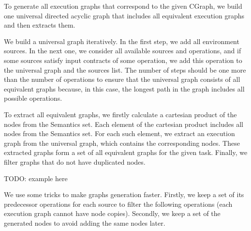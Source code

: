 To generate all execution graphs that correspond to the given CGraph, we build one universal directed acyclic graph that includes all equivalent execution graphs and then extracts them.





We build a universal graph iteratively.
In the first step, we add all environment sources.
In the next one, we consider all available sources and operations, and if some sources satisfy input contracts of some operation, we add this operation to the universal graph and the sources list.
The number of steps should be one more than the number of operations to ensure that the universal graph consists of all equivalent graphs because, in this case, the longest path in the graph includes all possible operations.

To extract all equivalent graphs, we firstly calculate a cartesian product of the nodes from the Semantics set.
Each element of the cartesian product includes all nodes from the Semantics set.
For each such element, we extract an execution graph from the universal graph, which contains the corresponding nodes.
These extracted graphs form a set of all equivalent graphs for the given task.
Finally, we filter graphs that do not have duplicated nodes.

TODO: example here

We use some tricks to make graphs generation faster.
Firstly, we keep a set of its predecessor operations for each source to filter the following operations (each execution graph cannot have node copies).
Secondly, we keep a set of the generated nodes to avoid adding the same nodes later.




